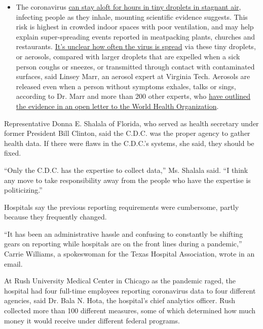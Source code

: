 \begin{itemize}
  \begin{itemize}
  \tightlist
  \item
    The coronavirus
    \href{https://www.nytimes.com/2020/07/04/health/239-experts-with-one-big-claim-the-coronavirus-is-airborne.html?action=click\&pgtype=Article\&state=default\&region=MAIN_CONTENT_3\&context=storylines_faq}{can
    stay aloft for hours in tiny droplets in stagnant air}, infecting
    people as they inhale, mounting scientific evidence suggests. This
    risk is highest in crowded indoor spaces with poor ventilation, and
    may help explain super-spreading events reported in meatpacking
    plants, churches and restaurants.
    \href{https://www.nytimes.com/2020/07/06/health/coronavirus-airborne-aerosols.html?action=click\&pgtype=Article\&state=default\&region=MAIN_CONTENT_3\&context=storylines_faq}{It's
    unclear how often the virus is spread} via these tiny droplets, or
    aerosols, compared with larger droplets that are expelled when a
    sick person coughs or sneezes, or transmitted through contact with
    contaminated surfaces, said Linsey Marr, an aerosol expert at
    Virginia Tech. Aerosols are released even when a person without
    symptoms exhales, talks or sings, according to Dr. Marr and more
    than 200 other experts, who
    \href{https://academic.oup.com/cid/article/doi/10.1093/cid/ciaa939/5867798}{have
    outlined the evidence in an open letter to the World Health
    Organization}.
  \end{itemize}
\end{itemize}

Representative Donna E. Shalala of Florida, who served as health
secretary under former President Bill Clinton, said the C.D.C. was the
proper agency to gather health data. If there were flaws in the C.D.C.'s
systems, she said, they should be fixed.

``Only the C.D.C. has the expertise to collect data,'' Ms. Shalala said.
``I think any move to take responsibility away from the people who have
the expertise is politicizing.''

Hospitals say the previous reporting requirements were cumbersome,
partly because they frequently changed.

``It has been an administrative hassle and confusing to constantly be
shifting gears on reporting while hospitals are on the front lines
during a pandemic,'' Carrie Williams, a spokeswoman for the Texas
Hospital Association, wrote in an email.

At Rush University Medical Center in Chicago as the pandemic raged, the
hospital had four full-time employees reporting coronavirus data to four
different agencies, said Dr. Bala N. Hota, the hospital's chief
analytics officer. Rush collected more than 100 different measures, some
of which determined how much money it would receive under different
federal programs.

